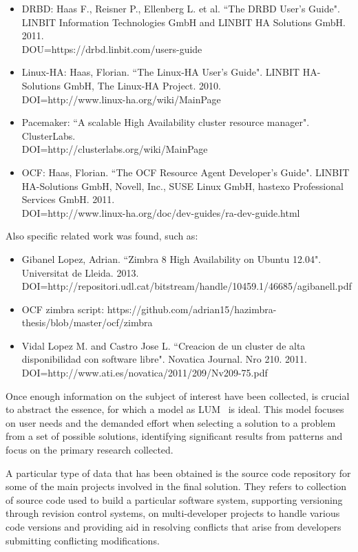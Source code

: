 \documentclass[a4paper, 12pt]{book}
\begin{document}
\begin{itemize}
	\item DRBD: Haas F., Reisner P., Ellenberg L. et al. ``The DRBD User's Guide". LINBIT Information Technologies GmbH and LINBIT HA Solutions GmbH. 2011.\\
	DOU=https://drbd.linbit.com/users-guide
	\item Linux-HA: Haas, Florian. ``The Linux-HA User's Guide". LINBIT HA-Solutions GmbH, The Linux-HA Project. 2010. \\
	DOI=http://www.linux-ha.org/wiki/MainPage
	\item Pacemaker: ``A scalable High Availability cluster resource manager". ClusterLabs. \\
	DOI=http://clusterlabs.org/wiki/MainPage
	\item OCF: Haas, Florian. ``The OCF Resource Agent Developer's Guide". LINBIT HA-Solutions GmbH, Novell, Inc., SUSE Linux GmbH, hastexo Professional Services GmbH. 2011. \\
        DOI=http://www.linux-ha.org/doc/dev-guides/ra-dev-guide.html
\end{itemize}

\noindent Also specific related work was found, such as:

\begin{itemize}
	\item Gibanel Lopez, Adrian. ``Zimbra 8 High Availability on Ubuntu 12.04". Universitat de Lleida. 2013. DOI=http://repositori.udl.cat/bitstream/handle/10459.1/46685/agibanell.pdf
	\item OCF zimbra script: https://github.com/adrian15/hazimbra-thesis/blob/master/ocf/zimbra
	\item Vidal Lopez M. and Castro Jose L. ``Creacion de un cluster de alta disponibilidad con software libre". Novatica Journal. Nro 210. 2011. \\
	DOI=http://www.ati.es/novatica/2011/209/Nv209-75.pdf
\end{itemize}

\noindent Once enough information on the subject of interest have been collected, is crucial to abstract the essence, for which a model as LUM~\cite{CandT1} is ideal. This model focuses on user needs and the demanded effort when selecting a solution to a problem from a set of possible solutions, identifying significant results from patterns and focus on the primary research collected.\bigskip

\noindent A particular type of data that has been obtained is the source code repository for some of the main projects involved in the final solution. They refers to collection of source code used to build a particular software system, supporting versioning through revision control systems, on multi-developer projects to handle various code versions and providing aid in resolving conflicts that arise from developers submitting conflicting modifications.
\end{document}
